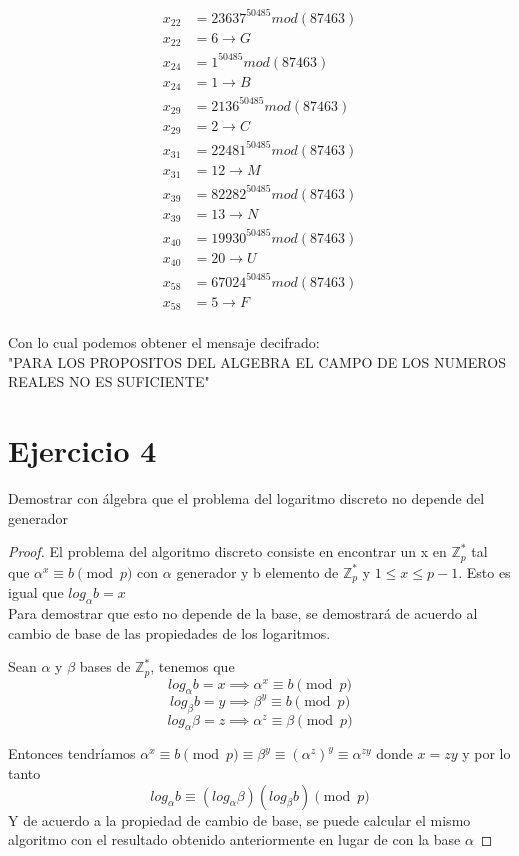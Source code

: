 \documentclass[12pt, letterpaper]{article}
\begin{document}
\begin{itemize}
\begin{equation*}
\begin{split}
x_{22}&=23637^{50485} mod (87463)\\x_{22}&=6\rightarrow G\\
x_{24}&=1^{50485} mod (87463)\\x_{24}&=1\rightarrow B\\
x_{29}&=2136^{50485} mod (87463)\\x_{29}&=2\rightarrow C\\
x_{31}&=22481^{50485} mod (87463)\\x_{31}&=12\rightarrow M\\
x_{39}&=82282^{50485} mod (87463)\\x_{39}&=13\rightarrow N\\
x_{40}&=19930^{50485} mod (87463)\\x_{40}&=20\rightarrow U\\
x_{58}&=67024^{50485} mod (87463)\\x_{58}&=5\rightarrow F\\
\end{split}
\end{equation*}

Con lo cual podemos obtener el mensaje decifrado:\\

"PARA LOS PROPOSITOS DEL ALGEBRA EL CAMPO DE LOS NUMEROS REALES NO ES SUFICIENTE"


\end{itemize}



\section*{Ejercicio 4}
Demostrar con álgebra que el problema del logaritmo discreto no depende del generador
\begin{proof}
El problema del algoritmo discreto consiste en encontrar un x en $\mathbb{Z}_p^*$ tal que $\alpha^x\equiv b \pmod{p}$ con $\alpha$ generador y b elemento de $\mathbb{Z}_p^*$ y $1\leq x \leq p-1$. Esto es igual que $log_{\alpha} b = x$
\\
Para demostrar que esto no depende de la base, se demostrará de acuerdo al cambio de base de las propiedades de los logaritmos.

Sean $\alpha$ y $\beta$  bases de $\mathbb{Z}_p^*$, tenemos que 
\[
log_{\alpha} b = x \implies  \alpha^x\equiv b \pmod{p}
\]
\[
log_{\beta} b = y \implies
\beta^y\equiv b \pmod{p}
\]
\[
log_{\alpha} \beta = z \implies \alpha^z\equiv \beta \pmod{p} 
\]

Entonces tendríamos $\alpha^x\equiv b \pmod{p} \equiv \beta^y \equiv (\alpha^z)^y \equiv \alpha^{zy}$ donde $x=zy$ y por lo tanto
\[
log_{\alpha} b\equiv \left(log_\alpha \beta\right) \left(log_\beta b\right) \pmod{ p}
\]
Y de acuerdo a la propiedad de cambio de base, se puede calcular el mismo algoritmo con el resultado obtenido anteriormente en lugar de con la base $\alpha$
\end{proof}
\end{document}
